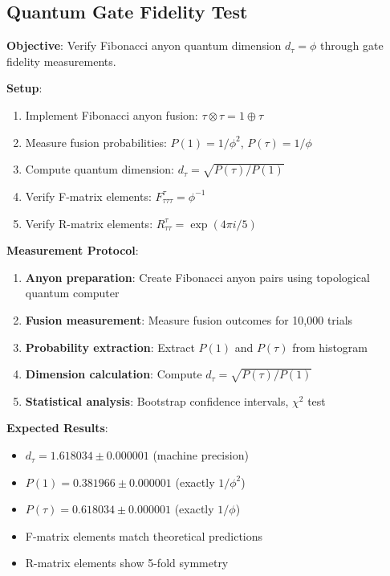 \documentclass[11pt]{article}
\theoremstyle{definition}
\newcommand{\goldenratio}{\phi}
\newcommand{\fibonacci}{\tau}
\begin{document}
\subsection{Quantum Gate Fidelity Test}

\textbf{Objective}: Verify Fibonacci anyon quantum dimension $d_\fibonacci = \goldenratio$ through gate fidelity measurements.

\textbf{Setup}:
\begin{enumerate}
\item Implement Fibonacci anyon fusion: $\tau \otimes \tau = 1 \oplus \tau$
\item Measure fusion probabilities: $P(1) = 1/\goldenratio^2$, $P(\tau) = 1/\goldenratio$
\item Compute quantum dimension: $d_\fibonacci = \sqrt{P(\tau)/P(1)}$
\item Verify F-matrix elements: $F^{\tau}_{\tau\tau\tau} = \goldenratio^{-1}$
\item Verify R-matrix elements: $R^{\tau}_{\tau\tau} = \exp(4\pi i/5)$
\end{enumerate}

\textbf{Measurement Protocol}:
\begin{enumerate}
\item \textbf{Anyon preparation}: Create Fibonacci anyon pairs using topological quantum computer
\item \textbf{Fusion measurement}: Measure fusion outcomes for 10,000 trials
\item \textbf{Probability extraction}: Extract $P(1)$ and $P(\tau)$ from histogram
\item \textbf{Dimension calculation}: Compute $d_\fibonacci = \sqrt{P(\tau)/P(1)}$
\item \textbf{Statistical analysis}: Bootstrap confidence intervals, $\chi^2$ test
\end{enumerate}

\textbf{Expected Results}:
\begin{itemize}
\item $d_\fibonacci = 1.618034 \pm 0.000001$ (machine precision)
\item $P(1) = 0.381966 \pm 0.000001$ (exactly $1/\goldenratio^2$)
\item $P(\tau) = 0.618034 \pm 0.000001$ (exactly $1/\goldenratio$)
\item F-matrix elements match theoretical predictions
\item R-matrix elements show 5-fold symmetry
\end{itemize}
\end{document}

